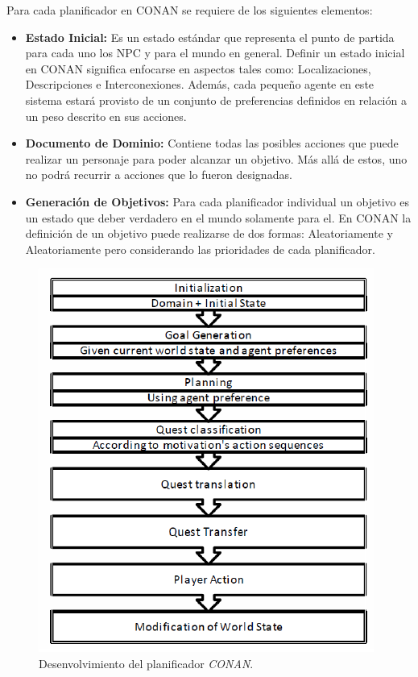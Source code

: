 Para cada planificador en CONAN se requiere de los siguientes elementos:

\begin{itemize}
\item \textbf{Estado Inicial:} Es un estado estándar que representa el punto de partida para cada uno los \ac{NPC} y para el mundo en general. Definir un estado inicial en CONAN significa enfocarse en aspectos tales como: Localizaciones, Descripciones e Interconexiones. Además, cada pequeño agente en este sistema estará provisto de un conjunto de preferencias definidos en relación a un peso descrito en sus acciones. 

\item \textbf{Documento de Dominio:} Contiene todas las posibles acciones que puede realizar un personaje para poder alcanzar un objetivo. Más allá de estos, uno no podrá recurrir a acciones que lo fueron designadas.

\item \textbf{Generación de Objetivos: } Para cada planificador individual un objetivo es un estado que deber verdadero en el mundo solamente para el. En CONAN la definición de un objetivo puede realizarse de dos formas: Aleatoriamente y Aleatoriamente pero considerando las prioridades de cada planificador. 

\end{itemize}

\begin{figure}[tph!]
\centerline{\includegraphics[totalheight=7cm]{2}}
    \caption{Desenvolvimiento del planificador \textit{CONAN}. \cite{breault2018let}}
    \label{fig:ptest1}
\end{figure}

